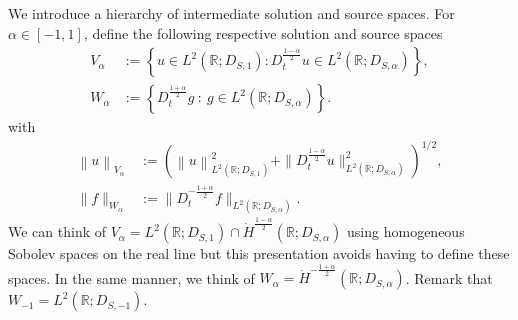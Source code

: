 \documentclass[11pt, letterpaper]{amsart}
\theoremstyle{definition}
\theoremstyle{remark}
\numberwithin{equation}{section}
\begin{document}
We  introduce a hierarchy of intermediate solution and source spaces. For $ \alpha \in [-1,1]$, define the following respective solution and source spaces 
\begin{align*}
    V_\alpha &:=\left \{ u \in L^2(\mathbb{R};D_{S,1}) : D_t^{\frac{1-\alpha}{2}}u \in L^2(\mathbb{R};D_{S,\alpha})\right \},\\
    W_\alpha &:= \left \{ D_t^{\frac{1+\alpha}{2}}g \ : \ g \in L^2(\mathbb{R};D_{S,\alpha}) \right \}.
\end{align*}
with 
\begin{align*}
    \left \| u \right \|_{V_\alpha}&:=\left ( \left \| u \right \|_{L^2(\mathbb{R};D_{S,1})}^2+   \| D_t^{\frac{1-\alpha}{2}}u  \|_{L^2(\mathbb{R}; D_{S,\alpha})}^2\right )^{1/2},
    \\
    \| f\|_{W_\alpha}&:=\| D_t^{-\frac{1+\alpha}{2}}f\|_{L^2(\mathbb{R};D_{S,\alpha})}.
\end{align*}
  We can think of $V_\alpha =  L^2(\mathbb{R};D_{S,1}) \cap \dot{H}^{\frac{1-\alpha}{2}}(\mathbb{R};D_{S,\alpha})$ using homogeneous Sobolev spaces on the real line but this presentation avoids having to define these spaces. 
In the same manner, we think of $W_\alpha=\dot{H}^{-\frac{1+\alpha}{2}}(\mathbb{R};D_{S,\alpha})$. Remark that $W_{-1}=L^2(\mathbb{R}; D_{S,-1}).$
\end{document}
